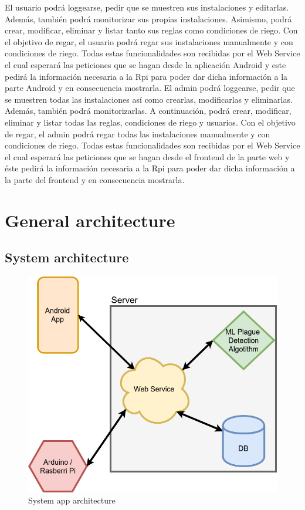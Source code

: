 \documentclass[11pt,a4paper]{article}
\begin{document}
El usuario podrá loggearse, pedir que se muestren sus instalaciones y editarlas. Además, también podrá monitorizar sus propias instalaciones. Asimismo, podrá crear, modificar, eliminar y listar tanto sus reglas como condiciones de riego. Con el objetivo de regar, el usuario podrá regar sus instalaciones manualmente y con condiciones de riego. Todas estas funcionalidades son recibidas por el Web Service el cual esperará las peticiones que se hagan desde la aplicación Android y este pedirá la información necesaria a la Rpi para poder dar dicha información a la parte Android y en consecuencia mostrarla. \newline\newline
El admin podrá loggearse, pedir que se muestren todas las instalaciones así como crearlas, modificarlas y eliminarlas. Además, también podrá monitorizarlas. A continuación, podrá crear, modificar, eliminar y listar todas las reglas, condiciones de riego y usuarios. Con el objetivo de regar, el admin podrá regar todas las instalaciones manualmente y con condiciones de riego. Todas estas funcionalidades son recibidas por el Web Service el cual esperará las peticiones que se hagan desde el frontend de la parte web y éste pedirá la información necesaria a la Rpi para poder dar dicha información a la parte del frontend y en consecuencia mostrarla.   

\newpage

\section{General architecture}
\subsection{System architecture}
\begin{figure}[hbtp]
\centering
\includegraphics[scale=0.6]{figures/AppArchitecture.png}
\caption{System app architecture}
\end{figure}
\end{document}

